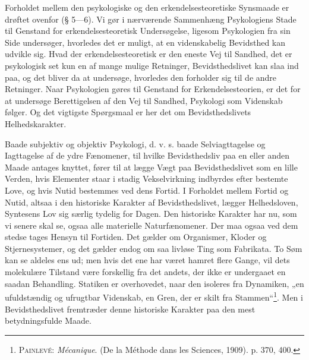 \documentclass[12pt]{article}
\newcommand{\opage}[1]{\marginnote{\footnotesize\textit{[#1]}}}
\begin{document}
Forholdet mellem den psykologiske og den erkendelsesteoretiske Synsmaade er
drøftet ovenfor (§ 5---6). Vi gør i nærværende Sammenhæng Psykologiens Stade til
Genstand for erkendelsesteoretisk Undersøgelse, ligesom Psykologien fra sin Side
undersøger, hvorledes det er muligt, at en videnskabelig Bevidsthed kan udvikle
sig. Hvad der erkendelsesteoretisk er den eneste Vej til Sandhed, det er
psykologisk set kun en af mange mulige Retninger, Bevidsthedslivet kan slaa ind paa, og
\setcounter{footnote}{0}%
\opage{57}det bliver da at undersøge, hvorledes den forholder sig til de andre Retninger.
Naar Psykologien gøres til Genstand for Erkendelsesteorien, er det for at undersøge
Berettigelsen af den Vej til Sandhed, Psykologi som Videnskab følger. Og det
vigtigste Spørgsmaal er her det om Bevidsthedslivets Helhedskarakter.

Baade subjektiv og objektiv Psykologi, d. v. s. baade Selviagttagelse og
Iagttagelse af de ydre Fænomener, til hvilke Bevidsthedsliv paa en eller anden Maade
antages knyttet, fører til at lægge Vægt paa Bevidsthedslivet som en lille Verden,
hvis Elementer staar i stadig Vekselvirkning indbyrdes efter bestemte Love, og hvis
Nutid bestemmes ved dens Fortid. I Forholdet mellem Fortid og Nutid, altsaa i
den historiske Karakter af Bevidsthedslivet, lægger Helhedsloven, Syntesens Lov sig
særlig tydelig for Dagen. Den historiske Karakter har nu, som vi senere skal
se, ogsaa alle materielle Naturfænomener. Der maa ogsaa ved dem stedse tages
Hensyn til Fortiden. Det gælder om Organismer, Kloder og Stjernesystemer, og det
gælder endog om saa livløse Ting som Fabrikata. To Søm kan se aldeles ens
ud; men hvis det ene har været hamret flere Gange, vil dets molekulære Tilstand
være forskellig fra det andets, der ikke er undergaaet en saadan Behandling.
Statiken er overhovedet, naar den isoleres fra Dynamiken, „en ufuldstændig og
ufrugtbar Videnskab, en Gren, der er skilt fra
Stammen“\footnote{\textsc{Painlevé}: \textit{Mécanique}. (De la Méthode dans les
Sciences, 1909). p. 370, 400.}. Men i Bevidsthedslivet
fremtræder denne historiske Karakter paa den mest betydningsfulde Maade.
\end{document}
